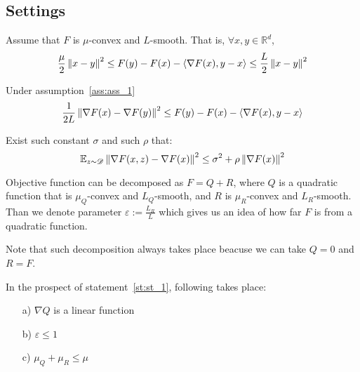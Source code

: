 \subsection{Settings} \label{subsec:settings}

\begin{assumption} \label{ass:ass_1}
    Assume that $F$ is $\mu$-convex and $L$-smooth. That is, $\forall x, y \in \mathbb{R}^d$,
    \[
    \frac{\mu}{2} \left\|x - y\right\|^2 \leq F(y) - F(x) - \langle \nabla F(x), y-x\rangle \leq \frac{L}{2} \left\|x-y\right\|^2
    \]
\end{assumption}

\begin{corollary} \label{cor:nesterov}
Under assumption~\ref{ass:ass_1}
    \[
    \frac{1}{2L} \left\|\nabla F(x) - \nabla F(y)\right\|^2 \leq F(y) - F(x) - \langle \nabla F(x), y-x\rangle
    \]
\end{corollary}


\begin{assumption} \label{ass:ass_2}
    Exist such constant $\sigma$ and such $\rho$ that:
    \[\mathbb{E}_{z \sim \mathcal{D}} \left\|\nabla F(x, z) - \nabla F(x)\right\|^2 \leq \sigma^2
    + \rho \left\|\nabla F(x)\right\|^2 \]
\end{assumption}

\begin{statement} \label{st:st_1}
    Objective function can be decomposed as $F = Q + R$, where $Q$ is a quadratic function that is $\mu_Q$-convex and $L_Q$-smooth, and $R$ is $\mu_R$-convex and $L_R$-smooth. Than we denote parameter
    \(\varepsilon := \frac{L_R}{L}\)
    which gives us an idea of how far $F$ is from a quadratic function.
\end{statement}

Note that such decomposition always takes place beacuse we can take $Q = 0$ and $R = F$.


\begin{corollary} \label{cor:linearity}
    In the prospect of statement~\ref{st:st_1}, following takes place: $\,$
    \begin{enumerate}
    \item[a)] $\nabla Q$ is a linear function
    \item[b)] \(\varepsilon \leq 1\)

    \item[c)] \(\mu_Q + \mu_R \leq \mu\)
\end{enumerate}
\end{corollary}